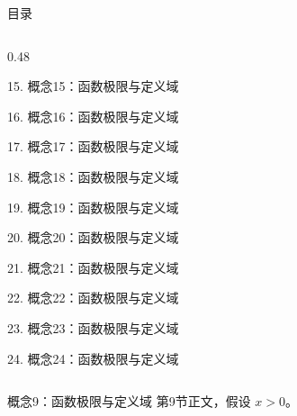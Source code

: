 \documentclass[aspectratio=169,10pt,fontset=fandol]{ctexbeamer}
\begin{document}
\begin{frame}[t,fragile]{目录}
\begin{columns}[T,onlytextwidth]
\begin{column}{0.48\textwidth}
{\color{gray!40}\small 15. 概念15：函数极限与定义域\par}\vspace{0.22em}
{\color{gray!40}\small 16. 概念16：函数极限与定义域\par}\vspace{0.22em}
{\color{gray!40}\small 17. 概念17：函数极限与定义域\par}\vspace{0.22em}
{\color{gray!40}\small 18. 概念18：函数极限与定义域\par}\vspace{0.22em}
{\color{gray!40}\small 19. 概念19：函数极限与定义域\par}\vspace{0.22em}
{\color{gray!40}\small 20. 概念20：函数极限与定义域\par}\vspace{0.22em}
{\color{gray!40}\small 21. 概念21：函数极限与定义域\par}\vspace{0.22em}
{\color{gray!40}\small 22. 概念22：函数极限与定义域\par}\vspace{0.22em}
{\color{gray!40}\small 23. 概念23：函数极限与定义域\par}\vspace{0.22em}
{\color{gray!40}\small 24. 概念24：函数极限与定义域\par}\vspace{0.22em}
\end{column}
\end{columns}
\end{frame}
\begin{frame}[t,fragile]{概念9：函数极限与定义域}
\normalsize
{\normalsize
第9节正文，假设 $x>0$。
}
\end{frame}
\end{document}
